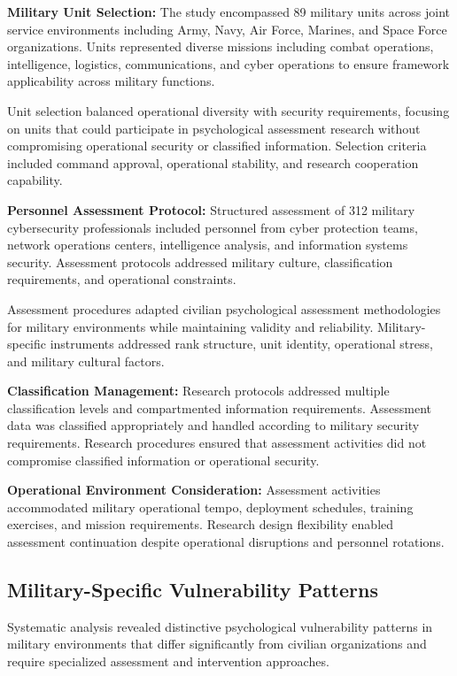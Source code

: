 \documentclass[10pt, twocolumn]{article}
\begin{document}
\textbf{Military Unit Selection:} The study encompassed 89 military units across joint service environments including Army, Navy, Air Force, Marines, and Space Force organizations. Units represented diverse missions including combat operations, intelligence, logistics, communications, and cyber operations to ensure framework applicability across military functions.

Unit selection balanced operational diversity with security requirements, focusing on units that could participate in psychological assessment research without compromising operational security or classified information. Selection criteria included command approval, operational stability, and research cooperation capability.

\textbf{Personnel Assessment Protocol:} Structured assessment of 312 military cybersecurity professionals included personnel from cyber protection teams, network operations centers, intelligence analysis, and information systems security. Assessment protocols addressed military culture, classification requirements, and operational constraints.

Assessment procedures adapted civilian psychological assessment methodologies for military environments while maintaining validity and reliability. Military-specific instruments addressed rank structure, unit identity, operational stress, and military cultural factors.

\textbf{Classification Management:} Research protocols addressed multiple classification levels and compartmented information requirements. Assessment data was classified appropriately and handled according to military security requirements. Research procedures ensured that assessment activities did not compromise classified information or operational security.

\textbf{Operational Environment Consideration:} Assessment activities accommodated military operational tempo, deployment schedules, training exercises, and mission requirements. Research design flexibility enabled assessment continuation despite operational disruptions and personnel rotations.

\subsection{Military-Specific Vulnerability Patterns}

Systematic analysis revealed distinctive psychological vulnerability patterns in military environments that differ significantly from civilian organizations and require specialized assessment and intervention approaches.
\end{document}
